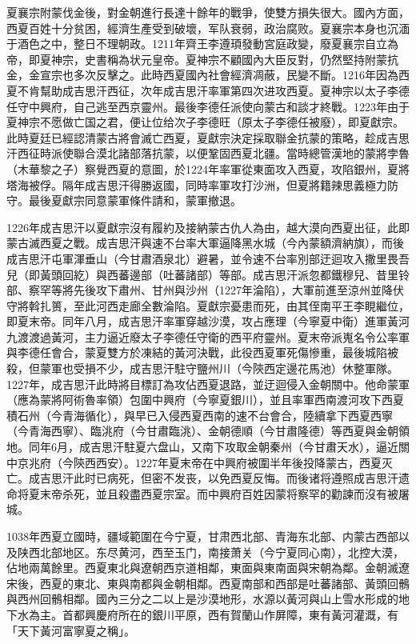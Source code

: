 夏襄宗附蒙伐金後，對金朝進行長達十餘年的戰爭，使雙方損失很大。國內方面，西夏百姓十分贫困，經濟生產受到破壞，军队衰弱，政治腐败。夏襄宗本身也沉湎于酒色之中，整日不理朝政。1211年齊王李遵頊發動宮庭政變，廢夏襄宗自立為帝，即夏神宗，史書稱為状元皇帝。夏神宗不顧國內大臣反對，仍然堅持附蒙抗金，金宣宗也多次反擊之。此時西夏國內社會經濟凋蔽，民變不斷。1216年因為西夏不肯幫助成吉思汗西征，次年成吉思汗率軍第四次进攻西夏。夏神宗以太子李德任守中興府，自己逃至西京靈州。最後李德任派使向蒙古和談才終戰。1223年由于夏神宗不愿做亡国之君，便让位给次子李德旺（原太子李德任被廢），即夏獻宗。此時夏廷已經認清蒙古將會滅亡西夏，夏獻宗決定採取聯金抗蒙的策略，趁成吉思汗西征時派使聯合漠北諸部落抗蒙，以便鞏固西夏北疆。當時總管漢地的蒙將孛魯（木華黎之子）察覺西夏的意圖，於1224年率軍從東面攻入西夏，攻陷銀州，夏將塔海被俘。隔年成吉思汗得勝返國，同時率軍攻打沙洲，但夏將籍辣思義極力防守。最後夏獻宗同意蒙軍條件請和，蒙軍撤退。

1226年成吉思汗以夏獻宗沒有履約及接納蒙古仇人為由，越大漠向西夏出征，此即蒙古滅西夏之戰。成吉思汗與速不台率大軍逼降黑水城（今內蒙額濟納旗），而後成吉思汗屯軍渾垂山（今甘肅酒泉北）避暑，並令速不台率別部迂迴攻入撒里畏吾兒（即黃頭回紇）與西蕃邊部（吐蕃諸部）等部。成吉思汗派忽都鐵穆兒、昔里铃部、察罕等將先後攻下肅州、甘州與沙州（1227年淪陷），大軍前進至涼州並降伏守將斡扎篑，至此河西走廊全數淪陷。夏獻宗憂患而死，由其侄南平王李睍繼位，即夏末帝。同年八月，成吉思汗率軍穿越沙漠，攻占應理（今寧夏中衛）進軍黃河九渡渡過黃河，主力逼近廢太子李德任守衛的西平府靈州。夏末帝派嵬名令公率軍與李德任會合，蒙夏雙方於凍結的黃河決戰，此役西夏軍死傷慘重，最後城陷被殺，但蒙軍也受損不少，成吉思汗駐守鹽州川（今陝西定邊花馬池）休整軍隊。1227年，成吉思汗此時將目標訂為攻佔西夏退路，並迂迴侵入金朝關中。他命蒙軍（應為蒙將阿術魯率領）包圍中興府（今寧夏銀川），並且率軍西南渡河攻下西夏積石州（今青海循化），與早已入侵西夏西南的速不台會合，陸續拿下西夏西寧（今青海西寧）、臨洮府（今甘肅臨洮）、金朝德順（今甘肅隆德）等西夏與金朝領地。同年6月，成吉思汗駐夏六盘山，又南下攻取金朝秦州（今甘肅天水），逼近關中京兆府（今陝西西安）。1227年夏末帝在中興府被圍半年後投降蒙古，西夏灭亡。成吉思汗此时已病死，但密不发丧，以免西夏反悔。而後诸将遵照成吉思汗遗命将夏末帝杀死，並且殺盡西夏宗室。而中興府百姓因蒙将察罕的勸諫而沒有被屠城。

1038年西夏立國時，疆域範圍在今宁夏，甘肃西北部、青海东北部、内蒙古西部以及陕西北部地区。东尽黄河，西至玉门，南接萧关（今宁夏同心南），北控大漠，佔地兩萬餘里。西夏東北與遼朝西京道相鄰，東面與東南面與宋朝為鄰。金朝滅遼宋後，西夏的東北、東與南都與金朝相鄰。西夏南部和西部是吐蕃諸部、黃頭回鶻與西州回鶻相鄰。國內三分之二以上是沙漠地形，水源以黃河與山上雪水形成的地下水為主。首都興慶府所在的銀川平原，西有賀蘭山作屏障，東有黃河灌溉，有「天下黃河富寧夏之稱」。

